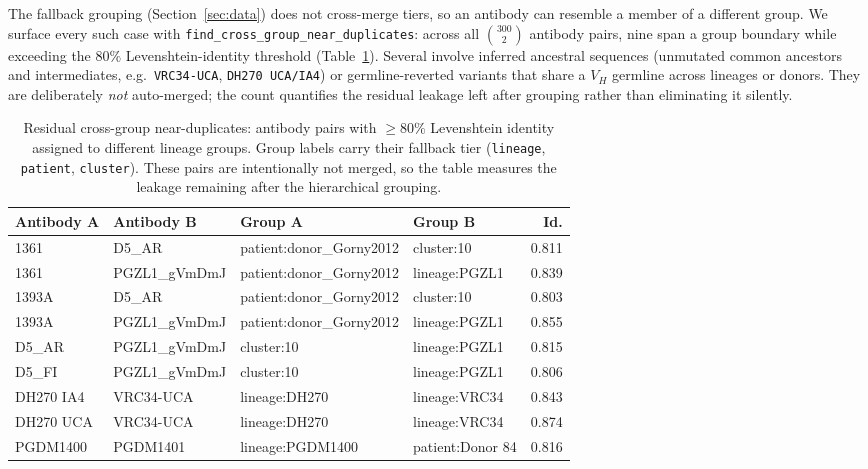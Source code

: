 \noindent The fallback grouping (Section~\ref{sec:data}) does not cross-merge
tiers, so an antibody can resemble a member of a different group. We surface
every such case with \texttt{find\_cross\_group\_near\_duplicates}: across all
$\binom{300}{2}$ antibody pairs, nine span a group boundary while exceeding the
$80\%$ Levenshtein-identity threshold (Table~\ref{tab:grouping_audit}). Several
involve inferred ancestral sequences (unmutated common ancestors and
intermediates, e.g.\ \texttt{VRC34-UCA}, \texttt{DH270 UCA/IA4}) or
germline-reverted variants that share a $V_H$ germline across lineages or donors.
They are deliberately \emph{not} auto-merged; the count quantifies the residual
leakage left after grouping rather than eliminating it silently.

\begin{table}[!htbp]
\centering
\scriptsize
\setlength{\tabcolsep}{3pt}
\begin{tabular}{llp{}p{}r}
\toprule
Antibody A & Antibody B & Group A & Group B & Id. \\
\midrule
1361      & D5\_AR        & patient:donor\_Gorny2012 & cluster:10       & 0.811 \\
1361      & PGZL1\_gVmDmJ & patient:donor\_Gorny2012 & lineage:PGZL1    & 0.839 \\
1393A     & D5\_AR        & patient:donor\_Gorny2012 & cluster:10       & 0.803 \\
1393A     & PGZL1\_gVmDmJ & patient:donor\_Gorny2012 & lineage:PGZL1    & 0.855 \\
D5\_AR    & PGZL1\_gVmDmJ & cluster:10               & lineage:PGZL1    & 0.815 \\
D5\_FI    & PGZL1\_gVmDmJ & cluster:10               & lineage:PGZL1    & 0.806 \\
DH270 IA4 & VRC34-UCA     & lineage:DH270            & lineage:VRC34    & 0.843 \\
DH270 UCA & VRC34-UCA     & lineage:DH270            & lineage:VRC34    & 0.874 \\
PGDM1400  & PGDM1401      & lineage:PGDM1400         & patient:Donor 84 & 0.816 \\
\bottomrule
\end{tabular}
\caption{Residual cross-group near-duplicates: antibody pairs with
$\geq 80\%$ Levenshtein identity assigned to different lineage groups. Group
labels carry their fallback tier (\texttt{lineage}, \texttt{patient},
\texttt{cluster}). These pairs are intentionally not merged, so the table
measures the leakage remaining after the hierarchical grouping.}
\label{tab:grouping_audit}
\end{table}


